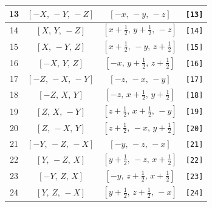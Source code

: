 \documentclass[fleqn,8pt]{jsarticle}
\begin{document}
\begin{longtable}{cccc}
13 & $\left[ - X,\, - Y,\, - Z \right]$ & $\left[ - x,\, - y,\, - z \right]$ & {\tt [13]} \\ \hline
14 & $\left[ X,\, Y,\, - Z \right]$ & $\left[ x + \frac{1}{2},\, y + \frac{1}{2},\, - z \right]$ & {\tt [14]} \\ \hline
15 & $\left[ X,\, - Y,\, Z \right]$ & $\left[ x + \frac{1}{2},\, - y,\, z + \frac{1}{2} \right]$ & {\tt [15]} \\ \hline
16 & $\left[ - X,\, Y,\, Z \right]$ & $\left[ - x,\, y + \frac{1}{2},\, z + \frac{1}{2} \right]$ & {\tt [16]} \\ \hline
17 & $\left[ - Z,\, - X,\, - Y \right]$ & $\left[ - z,\, - x,\, - y \right]$ & {\tt [17]} \\ \hline
18 & $\left[ - Z,\, X,\, Y \right]$ & $\left[ - z,\, x + \frac{1}{2},\, y + \frac{1}{2} \right]$ & {\tt [18]} \\ \hline
19 & $\left[ Z,\, X,\, - Y \right]$ & $\left[ z + \frac{1}{2},\, x + \frac{1}{2},\, - y \right]$ & {\tt [19]} \\ \hline
20 & $\left[ Z,\, - X,\, Y \right]$ & $\left[ z + \frac{1}{2},\, - x,\, y + \frac{1}{2} \right]$ & {\tt [20]} \\ \hline
21 & $\left[ - Y,\, - Z,\, - X \right]$ & $\left[ - y,\, - z,\, - x \right]$ & {\tt [21]} \\ \hline
22 & $\left[ Y,\, - Z,\, X \right]$ & $\left[ y + \frac{1}{2},\, - z,\, x + \frac{1}{2} \right]$ & {\tt [22]} \\ \hline
23 & $\left[ - Y,\, Z,\, X \right]$ & $\left[ - y,\, z + \frac{1}{2},\, x + \frac{1}{2} \right]$ & {\tt [23]} \\ \hline
24 & $\left[ Y,\, Z,\, - X \right]$ & $\left[ y + \frac{1}{2},\, z + \frac{1}{2},\, - x \right]$ & {\tt [24]} \\
\end{longtable}
\end{document}
